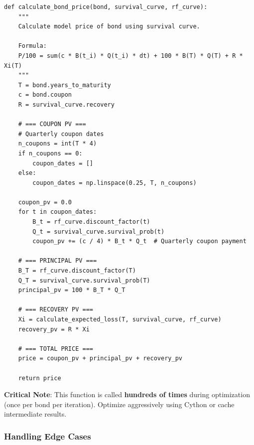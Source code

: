 \documentclass[11pt,a4paper]{article}
\begin{document}
\begin{implbox}
\begin{lstlisting}
def calculate_bond_price(bond, survival_curve, rf_curve):
    """
    Calculate model price of bond using survival curve.
    
    Formula:
    P/100 = sum(c * B(t_i) * Q(t_i) * dt) + 100 * B(T) * Q(T) + R * Xi(T)
    """
    T = bond.years_to_maturity
    c = bond.coupon
    R = survival_curve.recovery
    
    # === COUPON PV ===
    # Quarterly coupon dates
    n_coupons = int(T * 4)
    if n_coupons == 0:
        coupon_dates = []
    else:
        coupon_dates = np.linspace(0.25, T, n_coupons)
    
    coupon_pv = 0.0
    for t in coupon_dates:
        B_t = rf_curve.discount_factor(t)
        Q_t = survival_curve.survival_prob(t)
        coupon_pv += (c / 4) * B_t * Q_t  # Quarterly coupon payment
    
    # === PRINCIPAL PV ===
    B_T = rf_curve.discount_factor(T)
    Q_T = survival_curve.survival_prob(T)
    principal_pv = 100 * B_T * Q_T
    
    # === RECOVERY PV ===
    Xi = calculate_expected_loss(T, survival_curve, rf_curve)
    recovery_pv = R * Xi
    
    # === TOTAL PRICE ===
    price = coupon_pv + principal_pv + recovery_pv
    
    return price
\end{lstlisting}

\textbf{Critical Note}: This function is called \textbf{hundreds of times} during optimization (once per bond per iteration). Optimize aggressively using Cython or cache intermediate results.
\end{implbox}

\subsubsection{Handling Edge Cases}
\end{document}
